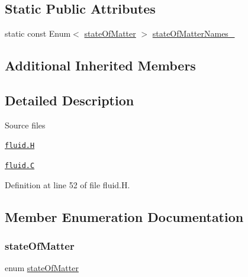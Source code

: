 \subsection*{Static Public Attributes}
\begin{DoxyCompactItemize}
\item 
static const Enum$<$ \hyperlink{classFoam_1_1fluid_a78daa7f427841ffa599af97aa64f9d4f}{state\+Of\+Matter} $>$ \hyperlink{classFoam_1_1fluid_a46762458d6c9ef25d1c23c8f6f309427}{state\+Of\+Matter\+Names\+\_\+}
\end{DoxyCompactItemize}
\subsection*{Additional Inherited Members}


\subsection{Detailed Description}
\begin{DoxyParagraph}{Source files}

\begin{DoxyItemize}
\item \href{../../../home/carlo/data/GeN-Foam/GeN-Foam_ffn/GeN-Foam/GeN-Foam/classes/thermalHydraulics/src/phaseModels/fluid/fluid.H}{\tt fluid.\+H} 
\item \href{../../../home/carlo/data/GeN-Foam/GeN-Foam_ffn/GeN-Foam/GeN-Foam/classes/thermalHydraulics/src/phaseModels/fluid/fluid.C}{\tt fluid.\+C} 
\end{DoxyItemize}
\end{DoxyParagraph}


Definition at line 52 of file fluid.\+H.



\subsection{Member Enumeration Documentation}
\mbox{\label{classFoam_1_1fluid_a78daa7f427841ffa599af97aa64f9d4f}} 
\subsubsection{\texorpdfstring{state\+Of\+Matter}{stateOfMatter}}
{\footnotesize\ttfamily enum \hyperlink{classFoam_1_1fluid_a78daa7f427841ffa599af97aa64f9d4f}{state\+Of\+Matter}}

